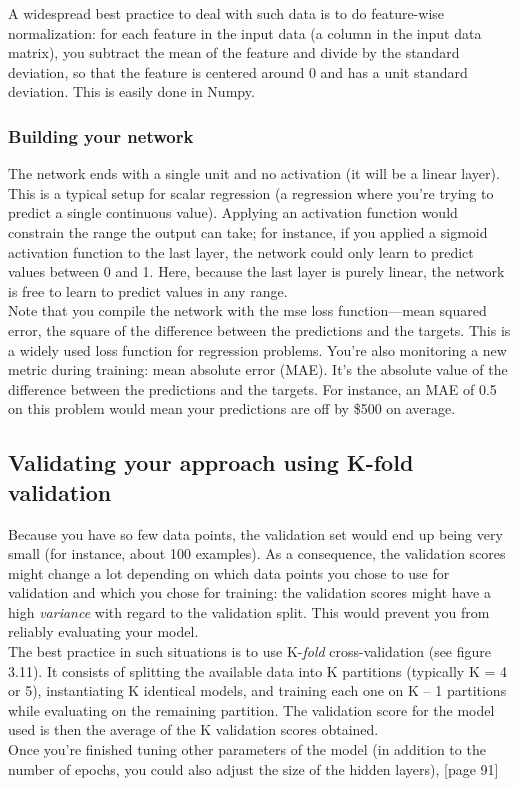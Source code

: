 \documentclass{article}
\numberwithin{equation}{section} %
\begin{document}
A widespread best practice to deal with such data is to do feature-wise normalization: for each feature in the input data (a column in the input data matrix), you subtract the mean of the feature and divide by the standard deviation, so that the feature is centered around 0 and has a unit standard deviation. This is easily done in Numpy.

\subsubsection{Building your network}

The network ends with a single unit and no activation (it will be a linear layer). This is a typical setup for scalar regression (a regression where you’re trying to predict a single continuous value). Applying an activation function would constrain the range the output can take; for instance, if you applied a sigmoid activation function to the last layer, the network could only learn to predict values between 0 and 1. Here, because the last layer is purely linear, the network is free to learn to predict values in any range. \\

Note that you compile the network with the mse loss function—mean squared error, the square of the difference between the predictions and the targets. This is a widely used loss function for regression problems. You’re also monitoring a new metric during training: mean absolute error (MAE). It’s the absolute value of the difference between the predictions and the targets. For instance, an MAE of 0.5 on this problem would mean your predictions are off by \$500 on average. \\

\subsection{Validating your approach using K-fold validation}

Because you have so few data points, the validation set would end up being very small (for instance, about 100 examples). As a consequence, the validation scores might change a lot depending on which data points you chose to use for validation and which you chose for training: the validation scores might have a high \textit{variance} with regard to the validation split. This would prevent you from reliably evaluating your model. \\

The best practice in such situations is to use K-\textit{fold} cross-validation (see figure 3.11). It consists of splitting the available data into K partitions (typically K = 4 or 5), instantiating K identical models, and training each one on K – 1 partitions while evaluating on the remaining partition. The validation score for the model used is then the average of the K validation scores obtained. \\

Once you’re finished tuning other parameters of the model (in addition to the
number of epochs, you could also adjust the size of the hidden layers), [page 91] \\
\end{document}
